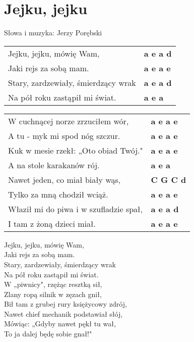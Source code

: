 \section{Jejku, jejku}

Słowa i muzyka: Jerzy Porębski

\vspace{2em}
\begin{tabular}{@{}p{8cm}@{}l@{}}
Jejku, jejku, mówię Wam, & \bfseries a e a d\\
Jaki rejs za sobą mam. & \bfseries a e a e\\
Stary, zardzewiały, śmierdzący wrak & \bfseries a e a d\\
Na pół roku zastąpił mi świat. & \bfseries a e a\\
\end{tabular}

\begin{tabular}{@{}p{8cm}@{}l@{}}
W cuchnącej norze zrzuciłem wór, & \bfseries a e a e\\
A tu - myk mi spod nóg szczur. & \bfseries a e a e\\
Kuk w mesie rzekł: „Oto obiad Twój." & \bfseries a e a e\\
A na stole karakanów rój. & \bfseries a e a\\
Nawet jeden, co miał biały wąs, & \bfseries C G C d\\
Tylko za mną chodził wciąż. & \bfseries a e a e\\
Właził mi do piwa i w szufladzie spał, & \bfseries a e a d\\
I tam z żoną dzieci miał. & \bfseries a e a e\\
\end{tabular}

\vspace{1em}
Jejku, jejku, mówię Wam, \\
Jaki rejs za sobą mam. \\
Stary, zardzewiały, śmierdzący wrak \\
Na pół roku zastąpił mi świat. \\

W „piwnicy", rzężąc resztką sił, \\
Zlany ropą silnik w zęzach gnił, \\
Bił tam z grubej rury księżycowy zdrój, \\
Nawet chief mechanik podstawiał słój, \\
Mówiąc: „Gdyby nawet pękł tu wał, \\
To ja dalej będę sobie gnał!" \\

